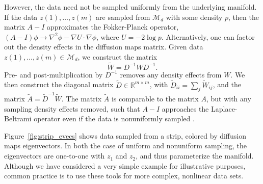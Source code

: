 \documentclass[preprint]{elsarticle}
\begin{document}
However, the data need not be sampled uniformly from the underlying manifold.
%
If the data $z(1), \dots, z(m)$ are sampled from $\mathcal{M}_d$ with some density $p$, then the matrix $A-I$ approximates the Fokker-Planck operator, $(A-I) \phi \rightarrow \nabla^2 \phi - \nabla U \cdot \nabla \phi$, where $U = -2 \log p$. 
%
Alternatively, one can factor out the density effects in the diffusion maps matrix.
%
Given data $z(1), \dots, z(m) \in \mathcal{M}_d$, we construct the matrix
%
\begin{equation}
\tilde{W} = D^{-1} W D^{-1}.
\end{equation}
%
Pre- and post-multiplication by $D^{-1}$ removes any density effects from $W$. 
%
We then construct the diagonal matrix $\tilde{D} \in \mathbb{R}^{m \times m}$, with $\tilde{D}_{ii} = \sum_j \tilde{W}_{ij}$, and the matrix $\tilde{A}  = \tilde{D}^{-1} \tilde{W}.$
%
The matrix $\tilde{A}$ is comparable to the matrix $A$, but with any sampling density effects removed, such that $A-I$ approaches the Laplace-Beltrami operator even if the data is nonuniformly sampled \cite{coifman2005geometric}. 

Figure~\ref{fig:strip_evecs} shows data sampled from a strip, colored by diffusion maps eigenvectors. 
%
In both the case of uniform and nonuniform sampling, the eigenvectors are one-to-one with $z_1$ and $z_2$, and thus parameterize the manifold. 
%
Although we have considered a very simple example for illustrative purposes, common practice is to use these tools for more complex, nonlinear data sets.
\end{document}
